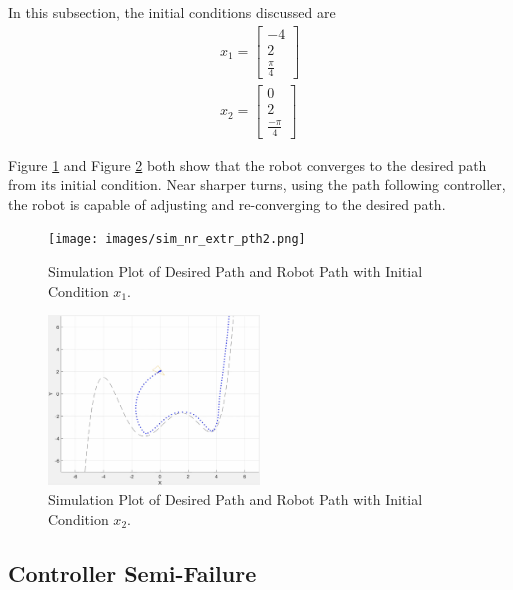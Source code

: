 \documentclass[11pt, letterpaper]{article}
\numberwithin{equation}{section}
\begin{document}
In this subsection, the initial conditions discussed are
\begin{gather}
    x_1 = \begin{bmatrix} -4 \\ 2 \\ \frac{\pi}{4} \end{bmatrix} \\
    x_2 = \begin{bmatrix} 0 \\ 2 \\ \frac{-\pi}{4} \end{bmatrix}
\end{gather}

Figure \ref{fig:sim_nr_extr_pth2} and Figure \ref{fig:sim_cent} both show that the robot converges to the desired path from its initial condition. Near sharper turns, using the path following controller, the robot is capable of adjusting and re-converging to the desired path.

\begin{figure}[H]
	\begin{center}
		\texttt{[image: images/sim\_nr\_extr\_pth2.png]}
		\caption{Simulation Plot of Desired Path and Robot Path with Initial Condition $x_1$.}
		\label{fig:sim_nr_extr_pth2}
	\end{center}
\end{figure}

\begin{figure}[H]
	\begin{center}
		\includegraphics[height=0.3\textheight, width=0.5\textwidth]{images/sim_cent.png}
		\caption{Simulation Plot of Desired Path and Robot Path with Initial Condition $x_2$.}
		\label{fig:sim_cent}
	\end{center}
\end{figure}

\subsection{Controller Semi-Failure}
\end{document}

